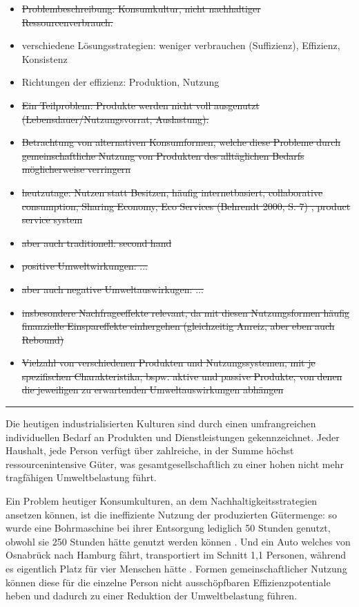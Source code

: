 \documentclass[11pt, titlepage=true]{scrartcl} %
\begin{document}
\begin{itemize}
  \item \sout{Problembeschreibung: Konsumkultur, nicht nachhaltiger
        Ressourcenverbrauch. }
  \item verschiedene Lösungsstrategien: weniger verbrauchen (Suffizienz),
    Effizienz, Konsistenz 
  \item Richtungen der effizienz: Produktion, Nutzung
  \item \sout{Ein Teilproblem: Produkte werden nicht voll ausgenutzt
    (Lebensdauer/Nutzungsvorrat, Auslastung).  }
  \item \sout{Betrachtung von alternativen Konsumformen, welche diese
      Probleme durch
      gemeinschaftliche Nutzung von Produkten des alltäglichen Bedarfs
    möglicherweise verringern}
  \item \sout{heutzutage: Nutzen statt Besitzen, häufig internetbasiert,
      collaborative
      consumption, Sharing Economy, Eco Services (Behrendt 2000, S. 7) ,
    product service system }
  \item \sout{aber auch traditionell: second hand}
  \item \sout{positive Umweltwirkungen: ...  }
  \item \sout{aber auch negative Umweltauswirkugen: ...  }
  \item \sout{insbesondere Nachfrageeffekte relevant, da mit
      diesen Nutzungsformen häufig finanzielle Einspareffekte einhergehen
    (gleichzeitig Anreiz, aber eben auch Rebound)}
  \item \sout{Vielzahl von verschiedenen Produkten und Nutzungssystemen,
      mit je spezifischen Charakteristika, bspw. aktive und passive
      Produkte, von denen die jeweiligen zu erwartenden Umweltauswirkungen
    abhängen}
      \end{itemize}
\hrule

Die heutigen industrialisierten Kulturen sind durch einen umfrangreichen
individuellen Bedarf an Produkten und Dienstleistungen gekennzeichnet. Jeder
Haushalt, jede Person verfügt über zahlreiche, in der Summe höchst
ressourcenintensive Güter, was gesamtgesellschaftlich zu einer hohen nicht mehr
tragfähigen Umweltbelastung führt.

Ein Problem heutiger Konsumkulturen, an dem Nachhaltigkeitsstrategien ansetzen
können, ist die ineffiziente Nutzung der produzierten Gütermenge: so wurde eine
Bohrmaschine bei ihrer Entsorgung lediglich 50 Stunden genutzt, obwohl sie 250
Stunden hätte genutzt werden können . Und ein
Auto welches von Osnabrück nach Hamburg fährt, transportiert im Schnitt 1,1
Personen, während es eigentlich Platz für vier Menschen hätte . Formen gemeinschaftlicher Nutzung  können diese für die einzelne
Person nicht ausschöpfbaren Effizienzpotentiale heben und dadurch zu einer
Reduktion der Umweltbelastung führen.
\end{document}
